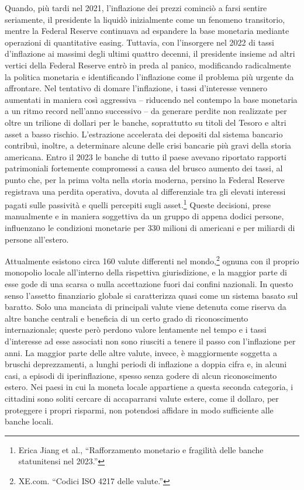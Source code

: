 \documentclass[
  a5paper,
  smalldemyvopaper,10pt,twoside,onecolumn,openright,extrafontsizes,hidelinks]{memoir}
\begin{document}
Quando, più tardi nel 2021, l'inflazione dei prezzi cominciò a farsi
sentire seriamente, il presidente la liquidò inizialmente come un
fenomeno transitorio, mentre la Federal Reserve continuava ad espandere
la base monetaria mediante operazioni di quantitative easing. Tuttavia,
con l'insorgere nel 2022 di tassi d'inflazione ai massimi degli ultimi
quattro decenni, il presidente insieme ad altri vertici della Federal
Reserve entrò in preda al panico, modificando radicalmente la politica
monetaria e identificando l'inflazione come il problema più urgente da
affrontare. Nel tentativo di domare l'inflazione, i tassi d'interesse
vennero aumentati in maniera così aggressiva -- riducendo nel contempo
la base monetaria a un ritmo record nell'anno successivo -- da generare
perdite non realizzate per oltre un trilione di dollari per le banche,
soprattutto su titoli del Tesoro e altri asset a basso rischio.
L'estrazione accelerata dei depositi dal sistema bancario contribuì,
inoltre, a determinare alcune delle crisi bancarie più gravi della
storia americana. Entro il 2023 le banche di tutto il paese avevano
riportato rapporti patrimoniali fortemente compromessi a causa del
brusco aumento dei tassi, al punto che, per la prima volta nella storia
moderna, persino la Federal Reserve registrava una perdita operativa,
dovuta al differenziale tra gli elevati interessi pagati sulle passività
e quelli percepiti sugli asset.\footnote{Erica Jiang et al.,
  ``Rafforzamento monetario e fragilità delle banche statunitensi nel
  2023.''} Queste decisioni, prese manualmente e in maniera soggettiva
da un gruppo di appena dodici persone, influenzano le condizioni
monetarie per 330 milioni di americani e per miliardi di persone
all'estero.

Attualmente esistono circa 160 valute differenti nel mondo,\footnote{XE.com.
  ``Codici ISO 4217 delle valute.''} ognuna con il proprio monopolio
locale all'interno della rispettiva giurisdizione, e la maggior parte di
esse gode di una scarsa o nulla accettazione fuori dai confini
nazionali. In questo senso l'assetto finanziario globale si caratterizza
quasi come un sistema basato sul baratto. Solo una manciata di
principali valute viene detenuta come riserva da altre banche centrali e
beneficia di un certo grado di riconoscimento internazionale; queste
però perdono valore lentamente nel tempo e i tassi d'interesse ad esse
associati non sono riusciti a tenere il passo con l'inflazione per anni.
La maggior parte delle altre valute, invece, è maggiormente soggetta a
bruschi deprezzamenti, a lunghi periodi di inflazione a doppia cifra e,
in alcuni casi, a episodi di iperinflazione, spesso senza godere di
alcun riconoscimento estero. Nei paesi in cui la moneta locale
appartiene a questa seconda categoria, i cittadini sono soliti cercare
di accaparrarsi valute estere, come il dollaro, per proteggere i propri
risparmi, non potendosi affidare in modo sufficiente alle banche locali.
\end{document}
